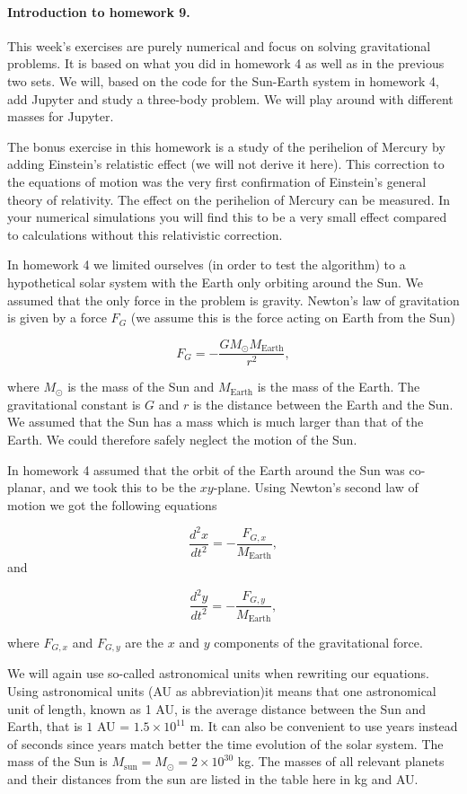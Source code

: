 \documentclass[%
oneside,                 %
final,                   %
10pt]{article}
\begin{document}
\noindent
\paragraph{Introduction to homework 9.}
This week's exercises are purely numerical and focus on solving
gravitational problems. It is based on what you did in homework 4 as
well as in the previous two sets. We will, based on the code for the
Sun-Earth system in homework 4, add Jupyter and study a three-body
problem.  We will play around with different masses for Jupyter.

The bonus exercise in this homework is a study of the perihelion of
Mercury by adding Einstein's relatistic effect (we will not derive it
here). This correction to the equations of motion was the very first
confirmation of Einstein's general theory of relativity.  The effect
on the perihelion of Mercury can be measured. In your numerical
simulations you will find this to be a very small effect compared to
calculations without this relativistic correction.



In homework 4 we limited ourselves (in order to test the algorithm) to
a hypothetical solar system with the Earth only orbiting around the
Sun. We assumed that the only force in the problem is
gravity. Newton's law of gravitation is given by a force $F_G$ (we assume this is the force acting on Earth from the Sun)

\[
F_G=-\frac{GM_{\odot}M_{\mathrm{Earth}}}{r^2},
\]

where $M_{\odot}$ is the mass of the Sun and $M_{\mathrm{Earth}}$ is
the mass of the Earth. The gravitational constant is $G$ and $r$ is
the distance between the Earth and the Sun.  We assumed that the Sun
has a mass which is much larger than that of the Earth. We could
therefore safely neglect the motion of the Sun.

In homework 4 assumed that the orbit of the Earth around the Sun 
was co-planar, and we took this to be the $xy$-plane.
Using Newton's second law of motion we got the following equations

\[
\frac{d^2x}{dt^2}=-\frac{F_{G,x}}{M_{\mathrm{Earth}}},
\]
and

\[
\frac{d^2y}{dt^2}=-\frac{F_{G,y}}{M_{\mathrm{Earth}}},
\]

where $F_{G,x}$ and $F_{G,y}$ are the $x$ and $y$ components of the
gravitational force.

We will again use so-called astronomical units when rewriting our
equations.  Using astronomical units (AU as abbreviation)it means that
one astronomical unit of length, known as 1 AU, is the average
distance between the Sun and Earth, that is $1$ AU = $1.5\times
10^{11}$ m.  It can also be convenient to use years instead of seconds
since years match better the time evolution of the solar system. The
mass of the Sun is $M_{\mathrm{sun}}=M_{\odot}=2\times 10^{30}$
kg. The masses of all relevant planets and their distances from the
sun are listed in the table here in kg and AU.
\end{document}
